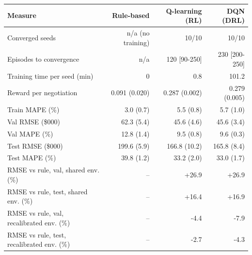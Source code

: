 \begin{tabular}{lrrr}
\toprule
Measure & Rule-based & Q-learning (RL) & DQN (DRL) \\
\midrule
Converged seeds & n/a (no training) & 10/10 & 10/10 \\
Episodes to convergence & n/a & 120 [90-250] & 230 [200-250] \\
Training time per seed (min) & 0 & 0.8 & 101.2 \\
Reward per negotiation & 0.091 (0.020) & 0.287 (0.002) & 0.279 (0.005) \\
Train MAPE (\%) & 3.0 (0.7) & 5.5 (0.8) & 5.7 (1.0) \\
Val RMSE (\$000) & 62.3 (5.4) & 45.6 (4.6) & 45.6 (3.4) \\
Val MAPE (\%) & 12.8 (1.4) & 9.5 (0.8) & 9.6 (0.3) \\
Test RMSE (\$000) & 199.6 (5.9) & 166.8 (10.2) & 165.8 (8.4) \\
Test MAPE (\%) & 39.8 (1.2) & 33.2 (2.0) & 33.0 (1.7) \\
RMSE vs rule, val, shared env. (\%) & -- & +26.9 & +26.9 \\
RMSE vs rule, test, shared env. (\%) & -- & +16.4 & +16.9 \\
RMSE vs rule, val, recalibrated env. (\%) & -- & -4.4 & -7.9 \\
RMSE vs rule, test, recalibrated env. (\%) & -- & -2.7 & -4.3 \\
\bottomrule
\end{tabular}
